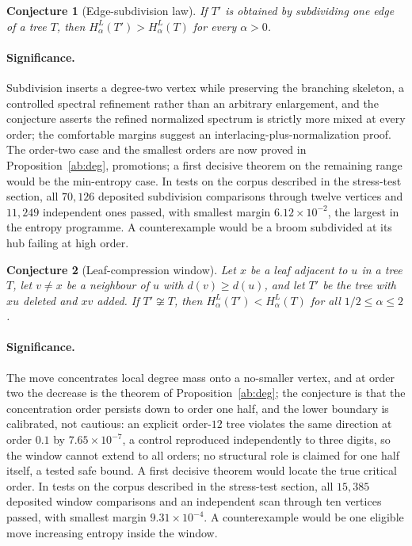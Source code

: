 \documentclass[11pt]{article}
\newtheorem{conjecture}{Conjecture}
\theoremstyle{definition}
\begin{document}
\begin{conjecture}[Edge-subdivision law]\label{ab3}
If $T'$ is obtained by subdividing one edge of a tree $T$, then $H^L_\alpha(T')>H^L_\alpha(T)$ for every $\alpha>0$.
\end{conjecture}

\paragraph{Significance.}
Subdivision inserts a degree-two vertex while preserving the branching skeleton, a controlled spectral refinement rather than an arbitrary enlargement, and the conjecture asserts the refined normalized spectrum is strictly more mixed at every order; the comfortable margins suggest an interlacing-plus-normalization proof.  The order-two case and the smallest orders are now proved in Proposition~\ref{ab:deg}, promotions; a first decisive theorem on the remaining range would be the min-entropy case.  In tests on the corpus described in the stress-test section, all $70{,}126$ deposited subdivision comparisons through twelve vertices and $11{,}249$ independent ones passed, with smallest margin $6.12\times10^{-2}$, the largest in the entropy programme.  A counterexample would be a broom subdivided at its hub failing at high order.

\begin{conjecture}[Leaf-compression window]\label{ab4}
Let $x$ be a leaf adjacent to $u$ in a tree $T$, let $v\ne x$ be a neighbour of $u$ with $d(v)\ge d(u)$, and let $T'$ be the tree with $xu$ deleted and $xv$ added.  If $T'\not\cong T$, then $H^L_\alpha(T')<H^L_\alpha(T)$ for all $1/2\le\alpha\le2$.
\end{conjecture}

\paragraph{Significance.}
The move concentrates local degree mass onto a no-smaller vertex, and at order two the decrease is the theorem of Proposition~\ref{ab:deg}; the conjecture is that the concentration order persists down to order one half, and the lower boundary is calibrated, not cautious: an explicit order-$12$ tree violates the same direction at order $0.1$ by $7.65\times10^{-7}$, a control reproduced independently to three digits, so the window cannot extend to all orders; no structural role is claimed for one half itself, a tested safe bound.  A first decisive theorem would locate the true critical order.  In tests on the corpus described in the stress-test section, all $15{,}385$ deposited window comparisons and an independent scan through ten vertices passed, with smallest margin $9.31\times10^{-4}$.  A counterexample would be one eligible move increasing entropy inside the window.
\end{document}
